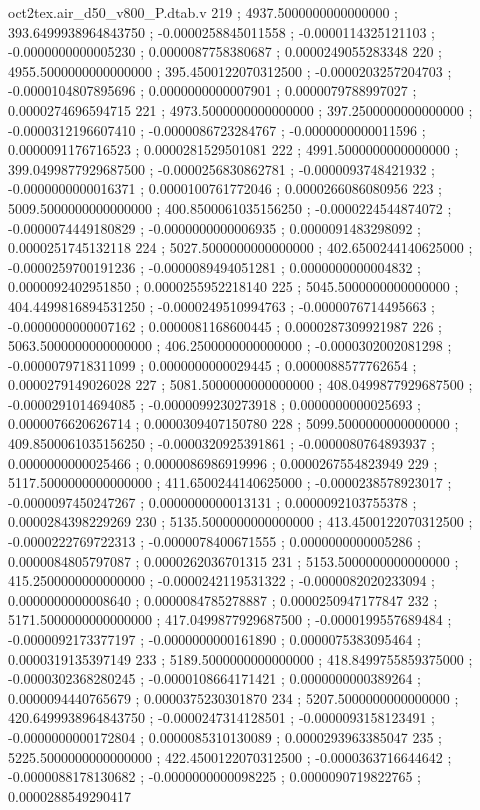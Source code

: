 \begin{filecontents}[overwrite]{oct2tex.air_d50_v800_P.dtab.v}
219 ; 4937.5000000000000000 ; 393.6499938964843750 ; -0.0000258845011558 ; -0.0000114325121103 ; -0.0000000000005230 ; 0.0000087758380687 ; 0.0000249055283348
220 ; 4955.5000000000000000 ; 395.4500122070312500 ; -0.0000203257204703 ; -0.0000104807895696 ; 0.0000000000007901 ; 0.0000079788997027 ; 0.0000274696594715
221 ; 4973.5000000000000000 ; 397.2500000000000000 ; -0.0000312196607410 ; -0.0000086723284767 ; -0.0000000000011596 ; 0.0000091176716523 ; 0.0000281529501081
222 ; 4991.5000000000000000 ; 399.0499877929687500 ; -0.0000256830862781 ; -0.0000093748421932 ; -0.0000000000016371 ; 0.0000100761772046 ; 0.0000266086080956
223 ; 5009.5000000000000000 ; 400.8500061035156250 ; -0.0000224544874072 ; -0.0000074449180829 ; -0.0000000000006935 ; 0.0000091483298092 ; 0.0000251745132118
224 ; 5027.5000000000000000 ; 402.6500244140625000 ; -0.0000259700191236 ; -0.0000089494051281 ; 0.0000000000004832 ; 0.0000092402951850 ; 0.0000255952218140
225 ; 5045.5000000000000000 ; 404.4499816894531250 ; -0.0000249510994763 ; -0.0000076714495663 ; -0.0000000000007162 ; 0.0000081168600445 ; 0.0000287309921987
226 ; 5063.5000000000000000 ; 406.2500000000000000 ; -0.0000302002081298 ; -0.0000079718311099 ; 0.0000000000029445 ; 0.0000088577762654 ; 0.0000279149026028
227 ; 5081.5000000000000000 ; 408.0499877929687500 ; -0.0000291014694085 ; -0.0000099230273918 ; 0.0000000000025693 ; 0.0000076620626714 ; 0.0000309407150780
228 ; 5099.5000000000000000 ; 409.8500061035156250 ; -0.0000320925391861 ; -0.0000080764893937 ; 0.0000000000025466 ; 0.0000086986919996 ; 0.0000267554823949
229 ; 5117.5000000000000000 ; 411.6500244140625000 ; -0.0000238578923017 ; -0.0000097450247267 ; 0.0000000000013131 ; 0.0000092103755378 ; 0.0000284398229269
230 ; 5135.5000000000000000 ; 413.4500122070312500 ; -0.0000222769722313 ; -0.0000078400671555 ; 0.0000000000005286 ; 0.0000084805797087 ; 0.0000262036701315
231 ; 5153.5000000000000000 ; 415.2500000000000000 ; -0.0000242119531322 ; -0.0000082020233094 ; 0.0000000000008640 ; 0.0000084785278887 ; 0.0000250947177847
232 ; 5171.5000000000000000 ; 417.0499877929687500 ; -0.0000199557689484 ; -0.0000092173377197 ; -0.0000000000161890 ; 0.0000075383095464 ; 0.0000319135397149
233 ; 5189.5000000000000000 ; 418.8499755859375000 ; -0.0000302368280245 ; -0.0000108664171421 ; 0.0000000000389264 ; 0.0000094440765679 ; 0.0000375230301870
234 ; 5207.5000000000000000 ; 420.6499938964843750 ; -0.0000247314128501 ; -0.0000093158123491 ; -0.0000000000172804 ; 0.0000085310130089 ; 0.0000293963385047
235 ; 5225.5000000000000000 ; 422.4500122070312500 ; -0.0000363716644642 ; -0.0000088178130682 ; -0.0000000000098225 ; 0.0000090719822765 ; 0.0000288549290417

\end{filecontents}
